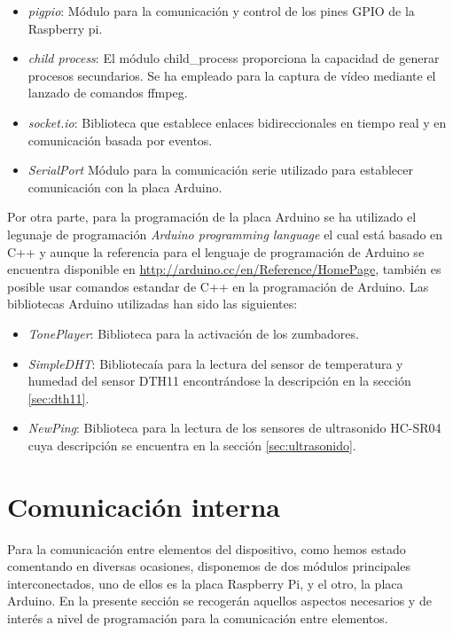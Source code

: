 \begin{itemize}
 \item \emph{pigpio}: Módulo para la comunicación y control de los pines GPIO de la Raspberry pi.
 \item \emph{child process}: El módulo child\_process proporciona la capacidad de generar procesos secundarios. Se ha empleado para la captura de vídeo mediante el lanzado de comandos ffmpeg.
 \item \emph{socket.io}: Biblioteca que establece enlaces bidireccionales en tiempo real y en comunicación basada por eventos.
 \item \emph{SerialPort} Módulo para la comunicación serie utilizado para establecer comunicación con la placa Arduino.
\end{itemize}


Por otra parte, para la programación de la placa Arduino se ha utilizado el legunaje de programación \emph{Arduino programming language} el cual está basado en C++ y aunque 
la referencia para el lenguaje de programación de Arduino se encuentra disponible en \url{http://arduino.cc/en/Reference/HomePage}, también es posible usar comandos estandar de C++ en la
programación de Arduino. Las bibliotecas Arduino utilizadas han sido las siguientes:\\

\begin{itemize}
 \item \emph{TonePlayer}: Biblioteca para la activación de los zumbadores.
 \item \emph{SimpleDHT}: Bibliotecaía para la lectura del sensor de temperatura y humedad del sensor DTH11 encontrándose la descripción en la sección \ref{sec:dth11}.
 \item \emph{NewPing}: Biblioteca para la lectura de los sensores de ultrasonido HC-SR04 cuya descripción se encuentra en la sección \ref{sec:ultrasonido}.
\end{itemize}


\section{Comunicación interna}

Para la comunicación entre elementos del dispositivo, como hemos estado comentando en diversas ocasiones, disponemos de dos módulos principales interconectados, uno de ellos es 
la placa Raspberry Pi, y el otro, la placa Arduino. En la presente sección se recogerán aquellos aspectos necesarios y de interés a nivel de programación para la comunicación entre elementos.\\

